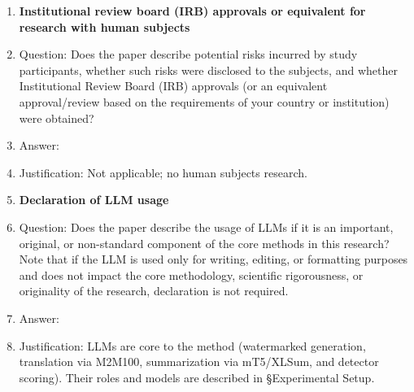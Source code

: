 \documentclass{article}
\begin{document}
\begin{enumerate}
\item {\bf Institutional review board (IRB) approvals or equivalent for research with human subjects}
    \item[] Question: Does the paper describe potential risks incurred by study participants, whether such risks were disclosed to the subjects, and whether Institutional Review Board (IRB) approvals (or an equivalent approval/review based on the requirements of your country or institution) were obtained?
    \item[] Answer: \answerNA{}
    \item[] Justification: Not applicable; no human subjects research.

\item {\bf Declaration of LLM usage}
    \item[] Question: Does the paper describe the usage of LLMs if it is an important, original, or non-standard component of the core methods in this research? Note that if the LLM is used only for writing, editing, or formatting purposes and does not impact the core methodology, scientific rigorousness, or originality of the research, declaration is not required.
    \item[] Answer: \answerYes{}
    \item[] Justification: LLMs are core to the method (watermarked generation, translation via M2M100, summarization via mT5/XLSum, and detector scoring). Their roles and models are described in §Experimental Setup.

\end{enumerate}
\end{document}
